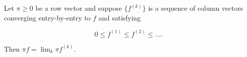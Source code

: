 Let $\pi \geq 0$ be a row vector and suppose $\{f^{(k)}\}$ is a sequence of column vectors converging entry-by-entry to $f$ and satisfying

$$0 \leq f^{(1)} \leq f^{(2)} \leq \dots.$$

Then $\pi f = \lim_{k} \pi f^{(k)}$.
